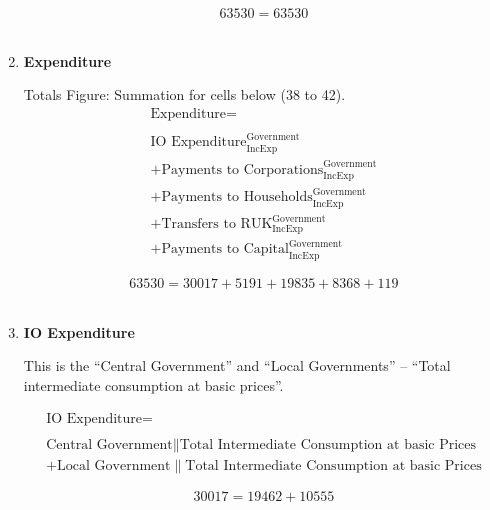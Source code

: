 \begin{enumerate}
\begin{equation} \nonumber
63530 = 63530
\end{equation}\\



\pagebreak

\item \textbf {Expenditure}

Totals Figure: Summation for cells below (38 to 42).\\

\begin{equation}
\begin{split}
\text{Expenditure} =  \\ \\
\text{IO Expenditure}^\text{Government}_\text{IncExp}\\
+\text{Payments to Corporations}^\text{Government}_\text{IncExp}\\
+\text{Payments to Households}^\text{Government}_\text{IncExp}\\
+\text{Transfers to RUK}^\text{Government}_\text{IncExp}\\
+\text{Payments to Capital}^\text{Government}_\text{IncExp}
\end{split} \label{eq:2.5.41}
\end{equation}

\begin{equation} \nonumber
63530 = 30017+5191+19835+8368+119
\end{equation}\\


\item \textbf {IO Expenditure}

This is the ``Central Government'' and ``Local Governments'' – ``Total intermediate consumption at basic prices''. \cite{ScotGov2013a}

\begin{equation}
\begin{split}
\text{IO Expenditure} =  \\ \\
\text{Central Government}\|\text{Total Intermediate Consumption at basic Prices}\\
+\text{Local Government}\|\text{Total Intermediate Consumption at basic Prices}
\end{split} \label{eq:2.5.42}
\end{equation}

\begin{equation} \nonumber
30017 = 19462+10555
\end{equation}\\



\end{enumerate}
